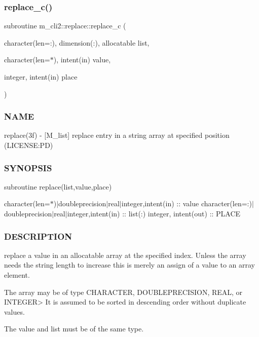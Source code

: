 \subsubsection{\texorpdfstring{replace\+\_\+c()}{replace\_c()}}
{\footnotesize\ttfamily subroutine m\+\_\+cli2\+::replace\+::replace\+\_\+c (\begin{DoxyParamCaption}\item[{character(len=\+:), dimension(\+:), allocatable}]{list,  }\item[{character(len=$\ast$), intent(in)}]{value,  }\item[{integer, intent(in)}]{place }\end{DoxyParamCaption})\hspace{0.3cm}{\ttfamily [private]}}



\subsubsection*{N\+A\+ME}

replace(3f) -\/ \mbox{[}M\+\_\+list\mbox{]} replace entry in a string array at specified position (L\+I\+C\+E\+N\+SE\+:PD) 

\subsubsection*{S\+Y\+N\+O\+P\+S\+IS}

subroutine replace(list,value,place)

character(len=$\ast$)$\vert$doubleprecision$\vert$real$\vert$integer,intent(in) \+:\+: value character(len=\+:)$\vert$doubleprecision$\vert$real$\vert$integer,intent(in) \+:\+: list(\+:) integer, intent(out) \+:\+: P\+L\+A\+CE

\subsubsection*{D\+E\+S\+C\+R\+I\+P\+T\+I\+ON}

\begin{DoxyVerb}replace a value in an allocatable array at the specified index. Unless the
array needs the string length to increase this is merely an assign of a value
to an array element.

The array may be of type CHARACTER, DOUBLEPRECISION, REAL, or INTEGER>
It is assumed to be sorted in descending order without duplicate values.

The value and list must be of the same type.
\end{DoxyVerb}


